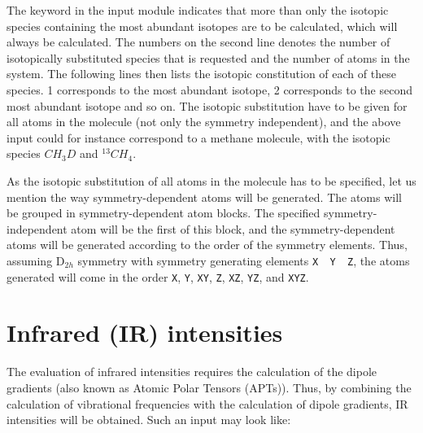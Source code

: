 The keyword  in the  input module
indicates that more than only the isotopic species containing the most
abundant isotopes are to be calculated, which will always be
calculated. The numbers on the second line denotes the number of
isotopically substituted species that is requested and the number of
atoms in the system. The following lines then
lists the isotopic constitution of each of these species. 1
corresponds to the most abundant isotope, 2 corresponds to the second
most abundant isotope and so on. The isotopic substitution have to be
given for all atoms in the molecule (not only the symmetry
independent), and the above input could for instance correspond to a
methane molecule, with the isotopic species $CH_3D$
and $^{13}CH_4$.

As the isotopic substitution of all atoms in the molecule has to be
specified, let us mention the way symmetry-dependent atoms will be
generated. The atoms will be grouped in symmetry-dependent atom
blocks. The specified symmetry-independent atom will be the first of
this block, and the symmetry-dependent atoms will be generated
according to the order of the symmetry elements. Thus, assuming
D$_{2h}$ symmetry with symmetry generating elements \verb|X  Y  Z|,
the atoms generated will come in the order \verb|X|, \verb|Y|,
\verb|XY|, \verb|Z|, \verb|XZ|, \verb|YZ|, and \verb|XYZ|.

\section{Infrared (IR) intensities}\label{sec:irint}

\begin{center}
\end{center}

 The evaluation of infrared intensities
requires the calculation of the
dipole gradients (also known as Atomic Polar Tensors (APTs)). Thus, by
combining the calculation of vibrational frequencies with the
calculation of dipole gradients, IR intensities will be obtained. Such
an input may look like:

